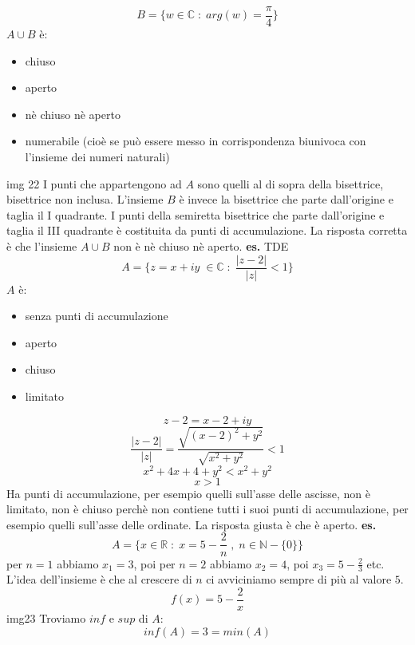 \[
    B=\{w \in \mathbb{C} \;:\; arg(w) = \frac{\pi}{4}\}
\]
 $A\cup B$ è:
\begin{itemize}
    \item chiuso
    \item aperto
    \item nè chiuso nè aperto
    \item numerabile (cioè se può essere messo in corrispondenza biunivoca con l'insieme dei numeri naturali)
\end{itemize}
img 22
\newline
I punti che appartengono ad $A$ sono quelli al di sopra della bisettrice, bisettrice non inclusa. L'insieme $B$ è invece la bisettrice che parte dall'origine e taglia il I quadrante.
\newline
I punti della semiretta bisettrice che parte dall'origine e taglia il III quadrante è costituita da punti di accumulazione.  
\newline
La risposta corretta è che l'insieme $A\cup B$ non è nè chiuso nè aperto.
\newline
\newline
\textbf{es.} TDE
\[
    A = \{z = x+iy \; \in \mathbb{C}\;:\; \frac{|z-2|}{|z|}<1 \}
\]
$A$ è:
\begin{itemize}
    \item senza punti di accumulazione
    \item aperto
    \item chiuso
    \item limitato
\end{itemize}
\[
    z-2 = x-2+iy
\]
\[
    \frac{|z-2|}{|z|} = \frac{\sqrt{(x-2)^2+y^2}}{\sqrt{x^2+y^2}}<1
\]
\[
    x^2 +4x +4 +y^2 < x^2+y^2
\]
\[
    x>1
\]
Ha punti di accumulazione, per esempio quelli sull'asse delle ascisse, non è limitato, non è chiuso perchè non contiene tutti i suoi punti di accumulazione, per esempio quelli sull'asse delle ordinate. La risposta giusta è che è aperto.
\newline
\newline
\textbf{es.} 
\[
    A = \{x \in \mathbb{R} \;:\; x = 5 -\frac{2}{n} \;,\; n \in \mathbb{N}-\{0\}\}
\]
per $n=1$ abbiamo $x_1 =3$, poi per $n=2$ abbiamo $x_2=4$, poi $x_3 = 5-\frac{2}{3}$ etc.
\newline
L'idea dell'insieme è che al crescere di $n$ ci avviciniamo sempre di più al valore $5$.
\newline
\[
    f(x) = 5-\frac{2}{x}
\] 
img23
\newline
Troviamo $inf$ e $sup$ di $A$:
\[
    inf(A)=3 = min(A)
\]
